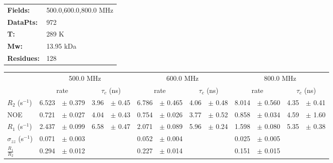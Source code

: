\documentclass[showkeys,aps,prb,prepreint,amssymb, amsmath,nobibnotes]{article}
\begin{document}
\begin{tabular}{ll}
\textbf{Fields:} &  500.0,600.0,800.0 MHz\\
\textbf{DataPts:} &  972\\
 \textbf{T:} & 289 K\\
\textbf{Mw:} & 13.95 kDa\\
\textbf{Residues: } &   128\\
\end{tabular}

\begin{small}
\noindent \begin{tabular}{l|rlrl|rlrl|rlrl}
& \multicolumn{4}{c}{500.0 MHz}& \multicolumn{4}{c}{600.0 MHz}& \multicolumn{4}{c}{800.0 MHz}\\
&  \multicolumn{2}{c}{rate} & \multicolumn{2}{c}{$\tau_c$ (ns)}   &  \multicolumn{2}{c}{rate} & \multicolumn{2}{c}{$\tau_c$ (ns)}   &  \multicolumn{2}{c}{rate} & \multicolumn{2}{c}{$\tau_c$ (ns)}   \\
\hline$R_2$  (s$^{-1}$)  &  6.523 & $\pm$ 0.379   &  3.96 & $\pm$ 0.45 &  6.786 & $\pm$ 0.465   &  4.06 & $\pm$ 0.48 &  8.014 & $\pm$ 0.560   &  4.35 & $\pm$ 0.41 \\
NOE  &  0.721 & $\pm$ 0.027   &  4.04 & $\pm$ 0.43 &  0.754 & $\pm$ 0.026   &  3.77 & $\pm$ 0.52 &  0.858 & $\pm$ 0.034   &  4.59 & $\pm$ 1.60 \\
$R_1$ (s$^{-1}$)  &  2.437 & $\pm$ 0.099   &  6.58 & $\pm$ 0.47 &  2.071 & $\pm$ 0.089   &  5.96 & $\pm$ 0.24 &  1.598 & $\pm$ 0.080   &  5.35 & $\pm$ 0.38 \\
$\sigma_{zz}$  (s$^{-1}$)  &  0.071 & $\pm$ 0.003   & & &  0.052 & $\pm$ 0.004   & & &  0.025 & $\pm$ 0.005   & & \\
$\frac{R_1}{R_2}$  &  0.294 & $\pm$ 0.012   & & &  0.227 & $\pm$ 0.014   & & &  0.151 & $\pm$ 0.015   & & \\
\end{tabular}
\end{small}
\end{document}

